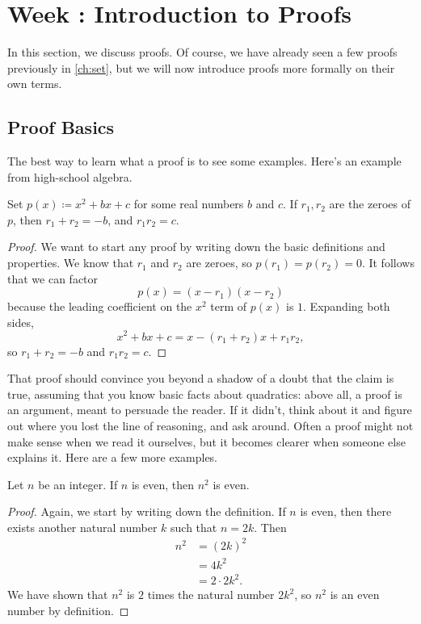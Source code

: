 \documentclass[../notes.tex]{subfiles}
\begin{document}
\section{Week \theweek: Introduction to Proofs}
In this section, we discuss proofs. Of course, we have already seen a few proofs previously in \cref{ch:set}, but we will now introduce proofs more formally on their own terms.

\subsection{Proof Basics}
The best way to learn what a proof is to see some examples. Here's an example from high-school algebra.
\begin{example}
    Set $p(x) \coloneqq x^2 + bx + c$ for some real numbers $b$ and $c$. If $r_1,r_2$ are the zeroes of $p$, then $r_1 + r_2 = -b$, and $r_1r_2 = c$.
\end{example}
\begin{proof}
    We want to start any proof by writing down the basic definitions and properties. We know that $r_1$ and $r_2$ are zeroes, so $p(r_1) = p(r_2) = 0$. It follows that we can factor
    \[p(x)=(x-r_1)(x-r_2)\]
    because the leading coefficient on the $x^2$ term of $p(x)$ is $1$. Expanding both sides,
    \[x^2 + bx + c = x - (r_1 + r_2)x + r_1r_2,\]
    so $r_1 + r_2 = -b$ and $r_1r_2 = c$.
\end{proof}
That proof should convince you beyond a shadow of a doubt that the claim is true, assuming that you know basic facts about quadratics: above all, a proof is an argument, meant to persuade the reader. If it didn't, think about it and figure out where you lost the line of reasoning, and ask around. Often a proof might not make sense when we read it ourselves, but it becomes clearer when someone else explains it. Here are a few more examples.
\begin{example} \label{exe:squares-even}
    Let $n$ be an integer. If $n$ is even, then $n^2$ is even.
\end{example}
\begin{proof}
    Again, we start by writing down the definition. If $n$ is even, then there exists another natural number $k$ such that $n = 2k$. Then
    \begin{align*}
        n^2 &= (2k)^2\\
        &= 4k^2\\
        &= 2 \cdot 2k^2.
    \end{align*}
    We have shown that $n^2$ is $2$ times the natural number $2k^2$, so $n^2$ is an even number by definition.
\end{proof}
\end{document}
